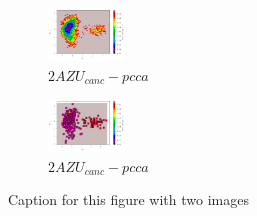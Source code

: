 \documentclass[fleqn,10pt]{wlscirep}
\begin{document}
\begin{figure}[!ht]
\centering
\begin{subfigure}{.5\textwidth}
  \centering
  \includegraphics[width=.9\linewidth]{2AZU_canc/2AZU_canc-tica.pdf}
  \caption{$2AZU_{canc}-pcca$}
  \label{sup:2AZU_canc-tica}
\end{subfigure}%
\begin{subfigure}{.5\textwidth}
  \centering
  \includegraphics[width=.9\linewidth]{2AZU_canc/2AZU_canc-pcca.pdf}
  \caption{$2AZU_{canc}-pcca$}
  \label{sup:2AZU_canc-pcca}
\end{subfigure}
\caption{Caption for this figure with two images}
\label{sup:2AZU_canc-cluster}
\end{figure}
\end{document}
